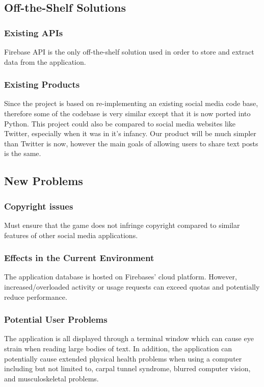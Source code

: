 \documentclass[12pt, titlepage]{article}
\begin{document}
\subsection{Off-the-Shelf Solutions}
\subsubsection{Existing APIs}
Firebase API is the only off-the-shelf solution used in order to store and extract data from the application.

\subsubsection{Existing Products}
Since the project is based on re-implementing an existing social media code base, therefore some of the codebase is very similar except that it is now ported into Python. This project could also be compared to social media websites like Twitter, especially when it was in it's infancy. Our product will be much simpler than Twitter is now, however the main goals of allowing users to share text posts is the same.

\subsection{New Problems}
\subsubsection{Copyright issues}
Must ensure that the game does not infringe copyright compared to similar features of other social media applications.

\subsubsection{Effects in the Current Environment}
The application database is hosted on Firebases' cloud platform. However, increased/overloaded activity or usage requests can exceed quotas and potentially reduce performance.

\subsubsection{Potential User Problems}
The application is all displayed through a terminal window which can cause eye strain when reading large bodies of text. In addition, the application can potentially cause extended physical health problems when using a computer including but not limited to, carpal tunnel syndrome, blurred computer vision, and musculoskeletal problems.
\end{document}
